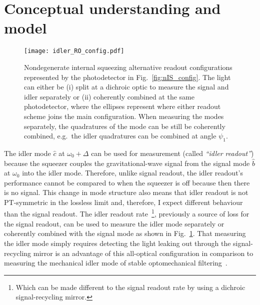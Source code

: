 \section{Conceptual understanding and model}
\label{sec:nIS_idlerRO_model}

\begin{figure}[!ht]
    \centering
    \texttt{[image: idler\_RO\_config.pdf]}
    \caption{Nondegenerate internal squeezing alternative readout configurations represented by the photodetector in Fig.~\ref{fig:nIS_config}. The light can either be (i) split at a dichroic optic to measure the signal and idler separately or (ii) coherently combined at the same photodetector, where the ellipses represent where either readout scheme joins the main configuration. When measuring the modes separately, the quadratures of the mode can be still be coherently combined, e.g.\ the idler quadratures can be combined at angle $\psi_1$.}
    \label{fig:idler_RO_config}
\end{figure}

The idler mode $\hat c$ at $\omega_0+\Delta$ can be used for measurement (called \emph{``idler readout''}) because the squeezer couples the gravitational-wave signal from the signal mode $\hat b$ at $\omega_0$ into the idler mode. Therefore, unlike signal readout, the idler readout's performance cannot be compared to when the squeezer is off because then there is no signal. This change in mode structure also means that idler readout is not PT-symmetric in the lossless limit and, therefore, I expect different behaviour than the signal readout.
The idler readout rate~\footnote{Which can be made different to the signal readout rate by using a dichroic signal-recycling mirror.}, previously a source of loss for the signal readout, can be used to measure the idler mode separately or coherently combined with the signal mode as shown in Fig.~\ref{fig:idler_RO_config}. That measuring the idler mode simply requires detecting the light leaking out through the signal-recycling mirror is an advantage of this all-optical configuration in comparison to measuring the mechanical idler mode of stable optomechanical filtering~\cite{liEnhancingInterferometerSensitivity2021}.

